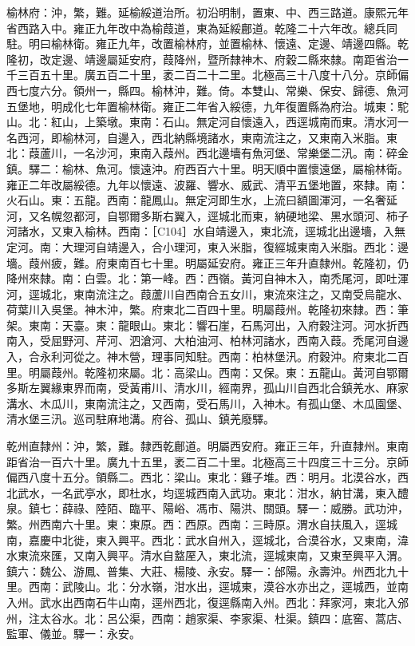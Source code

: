 \begin{pinyinscope}
榆林府：沖，繁，難。延榆綏道治所。初沿明制，置東、中、西三路道。康熙元年省西路入中。雍正九年改中為榆葭道，東為延綏鄜道。乾隆二十六年改。總兵同駐。明曰榆林衛。雍正九年，改置榆林府，並置榆林、懷遠、定邊、靖邊四縣。乾隆初，改定邊、靖邊屬延安府，葭降州，暨所隸神木、府穀二縣來隸。南距省治一千三百五十里。廣五百二十里，袤二百二十二里。北極高三十八度十八分。京師偏西七度六分。領州一，縣四。榆林沖，難。倚。本雙山、常樂、保安、歸德、魚河五堡地，明成化七年置榆林衛。雍正二年省入綏德，九年復置縣為府治。城東：駝山。北：紅山，上築墩。東南：石山。無定河自懷遠入，西逕城南而東。清水河一名西河，即榆林河，自邊入，西北納縣境諸水，東南流注之，又東南入米脂。東北：葭蘆川，一名沙河，東南入葭州。西北邊墻有魚河堡、常樂堡二汛。南：碎金鎮。驛二：榆林、魚河。懷遠沖。府西百六十里。明天順中置懷遠堡，屬榆林衛。雍正二年改屬綏德。九年以懷遠、波羅、響水、威武、清平五堡地置，來隸。南：火石山。東：五龍。西南：龍鳳山。無定河即生水，上流曰額圖渾河，一名奢延河，又名幌忽都河，自鄂爾多斯右翼入，逕城北而東，納硬地梁、黑水頭河、柿子河諸水，又東入榆林。西南：［C104］水自靖邊入，東北流，逕城北出邊墻，入無定河。南：大理河自靖邊入，合小理河，東入米脂，復經城東南入米脂。西北：邊墻。葭州疲，難。府東南百七十里。明屬延安府。雍正三年升直隸州。乾隆初，仍降州來隸。南：白雲。北：第一峰。西：西嶺。黃河自神木入，南禿尾河，即吐渾河，逕城北，東南流注之。葭蘆川自西南合五女川，東流來注之，又南受烏龍水、荷葉川入吳堡。神木沖，繁。府東北二百四十里。明屬葭州。乾隆初來隸。西：筆架。東南：天臺。東：龍眼山。東北：響石崖，石馬河出，入府穀注河。河水折西南入，受屈野河、芹河、泗滄河、大柏油河、柏林河諸水，西南入葭。禿尾河自邊入，合永利河從之。神木營，理事同知駐。西南：柏林堡汛。府穀沖。府東北二百里。明屬葭州。乾隆初來屬。北：高梁山。西南：又保。東：五龍山。黃河自鄂爾多斯左翼緣東界而南，受黃甫川、清水川，經南界，孤山川自西北合鎮羌水、麻家溝水、木瓜川，東南流注之，又西南，受石馬川，入神木。有孤山堡、木瓜園堡、清水堡三汛。巡司駐麻地溝。府谷、孤山、鎮羌廢驛。

乾州直隸州：沖，繁，難。隸西乾鄜道。明屬西安府。雍正三年，升直隸州。東南距省治一百六十里。廣九十五里，袤二百二十里。北極高三十四度三十三分。京師偏西八度十五分。領縣二。西北：梁山。東北：雞子堆。西：明月。北漠谷水，西北武水，一名武亭水，即杜水，均逕城西南入武功。東北：泔水，納甘溝，東入醴泉。鎮七：薛祿、陸陌、臨平、陽峪、馮市、陽洪、關頭。驛一：威勝。武功沖，繁。州西南六十里。東：東原。西：西原。西南：三畤原。渭水自扶風入，逕城南，嘉慶中北徙，東入興平。西北：武水自州入，逕城北，合漠谷水，又東南，湋水東流來匯，又南入興平。清水自盩厔入，東北流，逕城東南，又東至興平入渭。鎮六：魏公、游鳳、普集、大莊、楊陵、永安。驛一：邰陽。永壽沖。州西北九十里。西南：武陵山。北：分水嶺，泔水出，逕城東，漠谷水亦出之，逕城西，並南入州。武水出西南石牛山南，逕州西北，復逕縣南入州。西北：拜家河，東北入邠州，注太谷水。北：呂公渠，西南：趙家渠、李家渠、杜渠。鎮四：底窖、蒿店、監軍、儀並。驛一：永安。


\end{pinyinscope}
